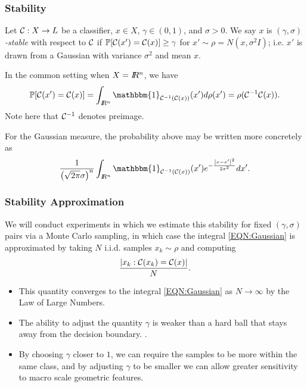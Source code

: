 \begin{frame}
  \frametitle{Stability}
\begin{definition}
Let $\mathcal{C}:X\to L$ be a classifier, $x \in X$, $\gamma\in(0,1)$, and $\sigma>0$. We say $x$ is \emph{$(\gamma,\sigma)$-stable} with respect to $\mathcal{C}$ if $\mathbb{P}[\mathcal{C}(x')=\mathcal{C}(x)] \geq \gamma$ for $x' \sim \rho = N(x, \sigma^2 I)$; i.e. $x'$ is drawn from a Gaussian with variance $\sigma^2$ and mean $x$.
\end{definition}

 In the common setting when $X=I\!\!R^n$, we have
 \[\mathbb{P}[\CC(x')=\CC(x)] = \int_{\RR^n} \mathbbm{1}_{\CC^{-1}(\CC(x))} (x') d\rho (x') = \rho(\CC^{-1}\CC(x)).\]
 Note here that $\mathcal{C}^{-1}$ denotes preimage. %

 For the Gaussian measure, the probability above may be written more concretely as
 \begin{equation}\label{EQN:Gaussian}
 \frac{1}{\left(\sqrt{2\pi}\sigma\right)^{n}} \int_{\RR^n} \mathbbm{1}_{\CC^{-1}(\CC(x))} (x')e^{-\frac{\norm{x - x'}^2}{2\sigma^2}} dx'.
 \end{equation}
\end{frame}
\begin{frame}
  \frametitle{Stability Approximation}
  We will conduct experiments in which we estimate this stability for fixed $(\gamma,\sigma)$ pairs via a Monte Carlo sampling, in which case the integral \eqref{EQN:Gaussian} is approximated by taking $N$ i.i.d. samples $x_k \sim \rho$ and computing
 \[
     \frac{\left\lvert x_k : \mathcal{C}(x_k) = \mathcal{C}(x) \right\rvert}{N}.
 \]
\begin{itemize}
\item This quantity converges to the integral \eqref{EQN:Gaussian} as $N\to\infty$ by the Law of Large Numbers.\\

\item The ability to adjust the quantity $\gamma$ is weaker than a hard ball
  that stays away from the decision boundary. 
  \citet{khoury2018}.
  \item By choosing $\gamma$ closer to $1$, we can require the samples
    to be more within the same class, and by adjusting $\gamma$ to be
    smaller we can allow greater sensitivity to macro scale geometric features.
\end{itemize}
\end{frame}
